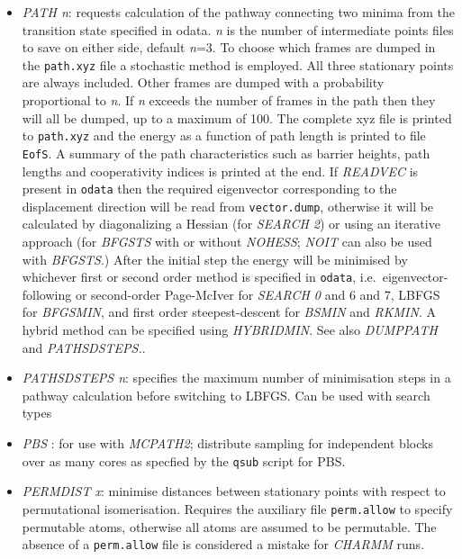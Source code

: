 \documentclass[12pt,a4paper,dvips]{article}
\begin{document}
\begin{itemize}
\item {\it PATH n\/}: requests calculation of the pathway connecting two minima from the transition
state specified in odata. {\it n\/} is the number of intermediate points files to save on either
side, default {\it n\/}=3. 
To choose which frames are dumped in the {\tt path.xyz} file a stochastic method is employed.
All three stationary points are always included. 
Other frames are dumped with a probability proportional to {\it n\/}. 
If {\it n\/} exceeds the number of frames in the path then they will all be dumped, up to a 
maximum of 100.
The complete xyz file is printed to {\tt path.xyz} and the energy as a function of
path length is printed to file {\tt EofS}. A summary of the path characteristics such as barrier heights,
path lengths and cooperativity indices is printed at the end. If {\it READVEC\/} is present in
{\tt odata} then the required eigenvector corresponding to the displacement direction will
be read from {\tt vector.dump}, otherwise it will be calculated by diagonalizing a Hessian (for
{\it SEARCH 2\/}) or using an iterative approach (for {\it BFGSTS\/} with or without 
{\it NOHESS\/}; {\it NOIT\/} can also be used with {\it BFGSTS\/}.) 
After the initial step the energy will be minimised by whichever first or second
order method is specified in {\tt odata}, i.e.~eigenvector-following or second-order Page-McIver
for {\it SEARCH 0\/} and 6 and 7, LBFGS for {\it BFGSMIN\/}, and first order steepest-descent
for {\it BSMIN\/} and {\it RKMIN\/}. 
A hybrid method can be specified using {\it HYBRIDMIN\/}.
See also {\it DUMPPATH\/} and {\it PATHSDSTEPS\/.}.

\item {\it PATHSDSTEPS n\/}: specifies the maximum number of minimisation steps
in a pathway calculation before switching to LBFGS. Can be used with search types

\item {\it PBS \/}: for use with {\it MCPATH2}; distribute sampling for independent blocks
over as many cores as specfied by the {\tt qsub} script for PBS.

\item {\it PERMDIST x\/}: minimise distances between stationary points with respect to
permutational isomerisation.
Requires the auxiliary file {\tt perm.allow} to specify permutable atoms, otherwise
all atoms are assumed to be permutable. The absence of a {\tt perm.allow}
file is considered a mistake for {\it CHARMM\/} runs.


\end{itemize}
\end{document}
